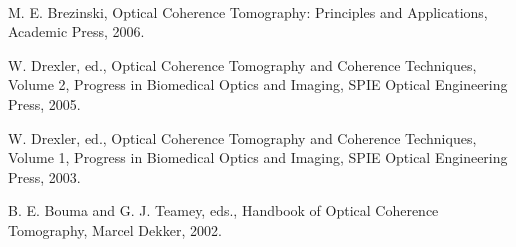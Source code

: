 \documentclass[UTF8]{ctexart}
\numberwithin{figure}{subsection}
\numberwithin{table}{subsection}
\begin{document}
\begin{spacing}{0.5}
\begin{hangparas}{0.25cm}{1}
\bigbreak{}\\
\par M. E. Brezinski, Optical Coherence Tomography: Principles and Applications, Academic Press,
2006.\\
\par W. Drexler, ed., Optical Coherence Tomography and Coherence Techniques, Volume 2, Progress in Biomedical Optics and Imaging, SPIE Optical Engineering Press, 2005.\\
\par W. Drexler, ed., Optical Coherence Tomography and Coherence Techniques, Volume 1, Progress in
Biomedical Optics and Imaging, SPIE Optical Engineering Press, 2003.\\
\par B. E. Bouma and G. J. Teamey, eds., Handbook of Optical Coherence Tomography, Marcel Dekker,
2002.\\



\end{hangparas}
\end{spacing}
\end{document}
